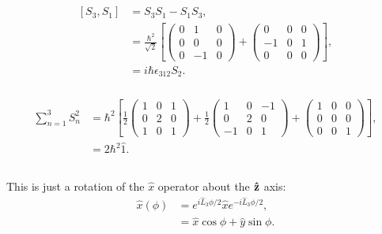 \documentclass[a4paper,12pt,twoside]{article}
\begin{document}
\subsection{}%
\subsubsection{}
\begin{align}
	\left[S_3,S_1\right] &= S_3S_1 - S_1S_3,\\
	&= \frac{\hbar^2}{\sqrt{2}}\left[
		\begin{pmatrix}
			0 & 1 & 0 \\
			0 & 0 & 0 \\
			0 & -1 & 0
		\end{pmatrix}
		+ \begin{pmatrix}
			0 & 0 & 0 \\
			-1 & 0 & 1 \\
			0 & 0 & 0
	\end{pmatrix}
	\right],\\
	&= i\hbar\epsilon_{312}S_2.
\end{align}
\subsubsection{}
\begin{align}
	\sum_{n=1}^{3} S_n^{2} &= \hbar^2 \left[
		\frac{1}{2}\begin{pmatrix}
			1 & 0 & 1\\
			0 & 2 & 0\\
			1 & 0 & 1
		\end{pmatrix}
		+ \frac{1}{2}\begin{pmatrix}
			1 & 0 & -1\\
			0 & 2 & 0 \\
			-1 & 0 & 1
		\end{pmatrix}
		+ \begin{pmatrix}
			1 & 0 & 0\\
			0 & 0 & 0\\
			0 & 0 & 1
		\end{pmatrix}
	\right],\\
	&= 2\hbar^2 \hat{1}.
\end{align}
\subsection{}%
This is just a rotation of the $\hat{x}$ operator about the $\vu{z}$ axis:
\begin{align}
	\hat{x}(\phi) &= e^{i\hat{L}_3\phi/2}\hat{x}e^{-i\hat{L}_3\phi/2},\\
	&= \hat{x}\cos\phi+\hat{y}\sin\phi.
\end{align}
\end{document}

